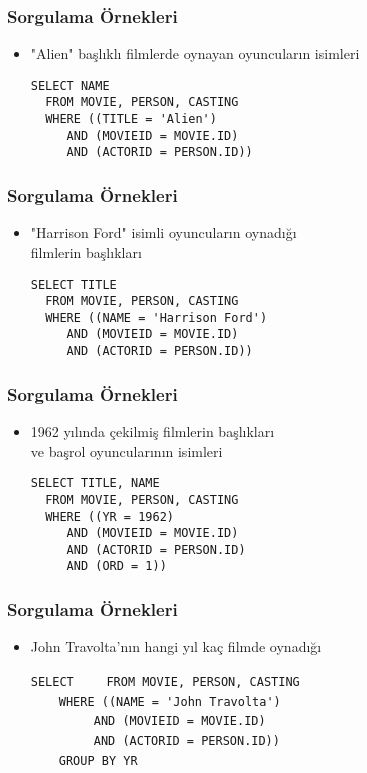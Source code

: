 \documentclass[dvipsnames]{beamer}
\theoremstyle{plain}
\begin{document}
\begin{frame}[fragile]
  \frametitle{Sorgulama Örnekleri}

  \begin{itemize}
    \item "Alien" başlıklı filmlerde oynayan oyuncuların isimleri
     \begin{lstlisting}
SELECT NAME
  FROM MOVIE, PERSON, CASTING
  WHERE ((TITLE = 'Alien')
     AND (MOVIEID = MOVIE.ID)
     AND (ACTORID = PERSON.ID))
      \end{lstlisting}
    \end{itemize}
\end{frame}

\begin{frame}[fragile]
  \frametitle{Sorgulama Örnekleri}

  \begin{itemize}
    \item "Harrison Ford" isimli oyuncuların oynadığı\\
                filmlerin başlıkları
    \begin{lstlisting}
SELECT TITLE
  FROM MOVIE, PERSON, CASTING
  WHERE ((NAME = 'Harrison Ford')
     AND (MOVIEID = MOVIE.ID)
     AND (ACTORID = PERSON.ID))
    \end{lstlisting}
  \end{itemize}
\end{frame}

\begin{frame}[fragile]
  \frametitle{Sorgulama Örnekleri}

  \begin{itemize}
    \item 1962 yılında çekilmiş filmlerin başlıkları\\
                ve başrol oyuncularının isimleri
    \begin{lstlisting}
SELECT TITLE, NAME
  FROM MOVIE, PERSON, CASTING
  WHERE ((YR = 1962)
     AND (MOVIEID = MOVIE.ID)
     AND (ACTORID = PERSON.ID)
     AND (ORD = 1))
    \end{lstlisting}
  \end{itemize}
\end{frame}

\begin{frame}
  \frametitle{Sorgulama Örnekleri}

  \begin{itemize}
    \item John Travolta'nın hangi yıl kaç filmde oynadığı
    
    \medskip
\lstinline!SELECT! 
~~~~\lstinline!FROM MOVIE, PERSON, CASTING!\\
\pause
~~~~\lstinline!WHERE ((NAME = 'John Travolta')!\\
~~~~~~~~~\lstinline!AND (MOVIEID = MOVIE.ID)!\\
~~~~~~~~~\lstinline!AND (ACTORID = PERSON.ID))!\\
\pause
~~~~\lstinline!GROUP BY YR!
  \end{itemize}
\end{frame}
\end{document}

